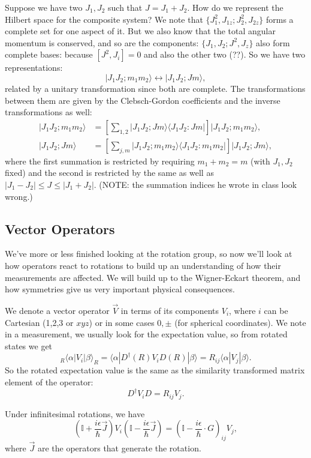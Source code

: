 \documentclass[fontsize=12pt]{scrartcl}
\newcommand{\bb}[1]{\mathbb{#1}}
\newcommand{\Id}{\bb{I}}
\newcommand{\la}{\langle}
\newcommand{\ra}{\rangle}
\begin{document}
Suppose we have two $J_1, J_2$ such that $J=J_1+J_2$. How do we represent the Hilbert space for the composite system? We note that $\{J_1^2, J_{1z};J_2^2,J_{2z}\}$ forms a complete set for one aspect of it. But we also know that the total angular momentum is conserved, and so are the components: $\{J_1,J_2;J^2, J_z\}$ also form complete bases: because $[J^2, J_i]=0$ and also the other two (??). So we have two representations: $$|J_1J_2;m_1m_2\ra \leftrightarrow |J_1J_2;J m\ra,$$ related by a unitary transformation since both are complete. The transformations between them are given by the Clebsch-Gordon coefficients and the inverse transformations as well: \begin{align*}|J_1J_2;m_1m_2\ra &= \left[\sum_{1,2}|J_1J_2;Jm\ra\la J_1J_2:Jm|\right]|J_1J_2;m_1m_2\ra,\\|J_1J_2;J m\ra &= \left[\sum_{j,m}|J_1J_2;m_1m_2\ra\la J_1J_2:m_1m_2|\right]|J_1J_2;Jm\ra,\end{align*} where the first summation is restricted by requiring $m_1+m_2=m$ (with $J_1,J_2$ fixed) and the second is restricted by the same as well as $|J_1-J_2|\leq J \leq |J_1+J_2|.$ (NOTE: the summation indices he wrote in class look wrong.)

\subsection{Vector Operators}

We've more or less finished looking at the rotation group, so now we'll look at how operators react to rotations to build up an understanding of how their measurements are affected. We will build up to the Wigner-Eckart theorem, and how symmetries give us very important physical consequences.

We denote a vector operator $\vec{V}$ in terms of its components $V_i$, where $i$ can be Cartesian (1,2,3 or $xyz$) or in some cases $0,\pm$ (for spherical coordinates). We note in a measurement, we usually look for the expectation value, so from rotated states we get $$_R\la\alpha|V_i|\beta\ra_R = \la \alpha|D^\dagger(R)V_iD(R)|\beta\ra = R_{ij}\la \alpha|V_j|\beta\ra.$$ So the rotated expectation value is the same as the similarity transformed matrix element of the operator: $$D^\dagger V_i D = R_{ij}V_j.$$

Under infinitesimal rotations, we have $$(\Id+\frac{i\epsilon}{\hbar}\vec{J})V_i (\Id-\frac{i\epsilon}{\hbar}\vec{J})=\left(\Id-\frac{i\epsilon}{\hbar}\cdot G\right)_{ij}V_j,$$ where $\vec{J}$ are the operators that generate the rotation.
\end{document}
